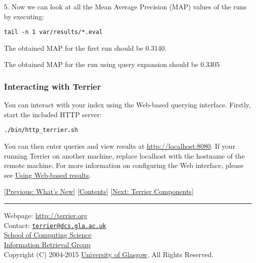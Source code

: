 5. Now we can look at all the Mean Average Precision (MAP) values of the
runs by executing:

\begin{verbatim}
tail -n 1 var/results/*.eval
\end{verbatim}

The obtained MAP for the first run should be 0.3140.

The obtained MAP for the run using query expansion should be 0.3305

\subsubsection{Interacting with Terrier}\label{interacting-with-terrier}

You can interact with your index using the Web-based querying interface.
Firstly, start the included HTTP server:

\begin{verbatim}
./bin/http_terrier.sh
\end{verbatim}

You can then enter queries and view results at
\url{http://localhost:8080}. If your running Terrier on another machine,
replace localhost with the hostname of the remote machine. For more
information on configuring the Web interface, please see
\href{terrier_http.html}{Using Web-based results}.

{[}\href{whats_new.html}{Previous: What's New}{]}
{[}\href{index.html}{Contents}{]} {[}\href{basicComponents.html}{Next:
Terrier Components}{]}

\begin{center}\rule{0.5\linewidth}{\linethickness}\end{center}

Webpage: \url{http://terrier.org}\\
Contact:
\href{mailto:terrier@dcs.gla.ac.uk}{\nolinkurl{terrier@dcs.gla.ac.uk}}\\
\href{http://www.dcs.gla.ac.uk/}{School of Computing Science}\\
\href{http://ir.dcs.gla.ac.uk/}{Information Retrieval Group}\\
Copyright (C) 2004-2015 \href{http://www.gla.ac.uk/}{University of
Glasgow}. All Rights Reserved.

